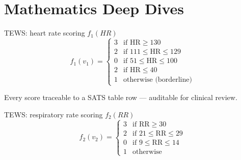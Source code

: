 \section{Mathematics Deep Dives}

\begin{frame}{TEWS: heart rate scoring $f_1(HR)$}
  \begin{equation*}
    f_1(v_1) = \begin{cases}
      3 & \text{if HR} \geq 130 \\
      2 & \text{if } 111 \leq \mathrm{HR} \leq 129 \\
      0 & \text{if } 51 \leq \mathrm{HR} \leq 100 \\
      2 & \text{if HR} \leq 40 \\
      1 & \text{otherwise (borderline)}
    \end{cases}
  \end{equation*}


  Every score traceable to a SATS table row --- auditable for clinical review.
\end{frame}

\begin{frame}{TEWS: respiratory rate scoring $f_2(RR)$}
  \begin{equation*}
    f_2(v_2) = \begin{cases}
      3 & \text{if RR} \geq 30 \\
      2 & \text{if } 21 \leq \mathrm{RR} \leq 29 \\
      0 & \text{if } 9 \leq \mathrm{RR} \leq 14 \\
      1 & \text{otherwise}
    \end{cases}
  \end{equation*}

\end{frame}

